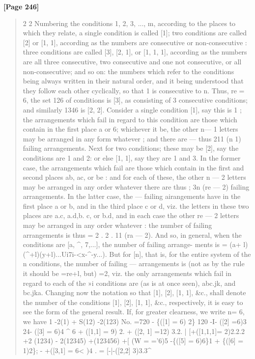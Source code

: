 \documentclass[11pt,a4paper]{book}
\begin{document}
\textbf{[Page 246]}\\[0.2cm]
\begin{quote}
2 2
Numbering the conditions 1, 2, 3, ..., m, according to the places to which they relate,
a single condition is called [1]; two conditions are called [2] or [1, 1], according as
the numbers are consecutive or non-consecutive : three conditions are called [3], [2, 1],
or [1, 1, 1], according as the numbers are all three consecutive, two consecutive and
one not consecutive, or all non-consecutive; and so on: the numbers which refer to
the conditions being always written in their natural order, and it being understood
that they follow each other cyclically, so that 1 is consecutive to n. Thus, re = 6, the
set 126 of conditions is [3], as consisting of 3 consecutive conditions; and similarly
1346 is [2, 2].
Consider a single condition [1], say this is 1 ; the arrangements which fail in
regard to this condition are those which contain in the first place a or 6; whichever
it be, the other n--- 1 letters may be arranged in any form whatever ; and there are
---
thus 211 (n 1) failing arrangements.
Next for two conditions; these may be [2], say the conditions are 1 and 2: or
else [1, 1], say they are 1 and 3. In the former case, the arrangements which fail
are those which contain in the first and second places ab, ac, or be : and for each of
these, the other n --- 2 letters may be arranged in any order whatever there are thus
;
3n (re --- 2) failing arrangements. In the latter case, the --- failing airangements have in
the first place a or b, and in the third place c or d, viz. the letters in these two
places are a.c, a.d,b. c, or b.d, and in each case the other re --- 2 letters may be arranged
in any order whatever : the number of failing arrangements is thus = 2 . 2 . 11 (ra --- 2).
And so, in general, when the conditions are [a, \textasciicircum{}, 7,...], the number of failing arrange-
ments is
= (a+ l)(\textasciicircum{}+l)(y+l)...Ui7i-<x-\textasciicircum{}-y...).
But for [n], that is, for the entire system of the n conditions, the number of failing
---
arrangements is (not as by the rule it should be =re+l, but) =2, viz. the only
arrangements which fail in regard to each of the »i conditions are (as is at once
seen), abc.jk, and bc.jka.
Changing now the notation so that [1], [2], [1, 1], \&c., shall denote the number
of the conditions [1], [2], [1, 1], \&c., respectively, it is easy to see the form of the
general result. If, for greater clearness, we write n= 6, we have
1 -2(1) + S(12) -2(123)
No. =720 - \{([1] = 6) 2\} 120 -I- ([2] =6)3 24- ([3] = 6)4 \textasciicircum{} 6
+ ([1,1] = 9) 2. + ([2, 1] =12) 3.2.
|
[+([1,1,1]= 2)2.2.2
+2 (1234) - 2(12345) +(123456)
+[ (W = ='6)5 -\{([5] = 6)6\}1 + \{([6] = 1)2\};
- +([3,1] = 6< )4 .
=
[-|-([2,2] 3)3.3\textasciicircum{}
\end{quote}
\end{document}
